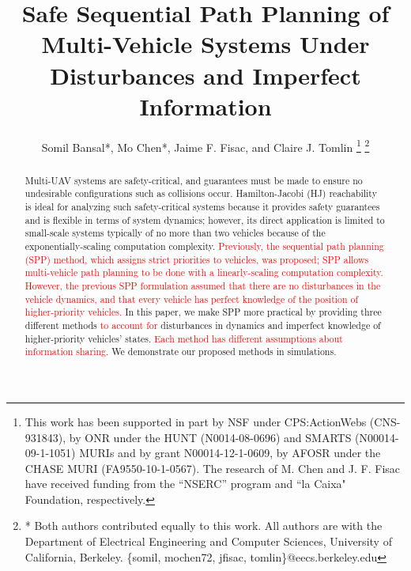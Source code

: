 \documentclass[letterpaper, 10 pt, conference]{ieeeconf}
\title{\LARGE \bf
Safe Sequential Path Planning of Multi-Vehicle Systems Under Disturbances and Imperfect Information}
\author{Somil Bansal*, Mo Chen*, Jaime F. Fisac, and Claire J. Tomlin
\thanks{This work has been supported in part by NSF under CPS:ActionWebs (CNS-931843), by ONR under the HUNT (N0014-08-0696) and SMARTS (N00014-09-1-1051) MURIs and by grant N00014-12-1-0609, by AFOSR under the CHASE MURI (FA9550-10-1-0567). The research of M. Chen and J. F. Fisac have received funding from the ``NSERC'' program and ``la Caixa" Foundation, respectively.}
\thanks{* Both authors contributed equally to this work. All authors are with the Department of Electrical Engineering and Computer Sciences, University of California, Berkeley. \{somil, mochen72, jfisac, tomlin\}@eecs.berkeley.edu}
}
\newcommand{\MCnote}{\textcolor{red}}
\begin{document}
\maketitle
\thispagestyle{empty}
\pagestyle{empty}

\begin{abstract}
Multi-UAV systems are safety-critical, and guarantees must be made to ensure no undesirable configurations such as collisions occur. Hamilton-Jacobi (HJ) reachability is ideal for analyzing such safety-critical systems because it provides safety guarantees and is flexible in terms of system dynamics; however, its direct application is limited to small-scale systems typically of no more than two vehicles because of the exponentially-scaling computation complexity. \MCnote{Previously, the sequential path planning (SPP) method, which assigns strict priorities to vehicles, was proposed; SPP allows multi-vehicle path planning to be done with a linearly-scaling computation complexity. However, the previous SPP formulation assumed that there are no disturbances in the vehicle dynamics, and that every vehicle has perfect knowledge of the position of higher-priority vehicles.} In this paper, we make SPP more practical by providing three different methods \MCnote{to account for} disturbances in dynamics and imperfect knowledge of higher-priority vehicles' states. \MCnote{Each method has different assumptions about information sharing}. We demonstrate our proposed methods in simulations.
\end{abstract}

 \vspace{-0.5em} 











\end{document}
